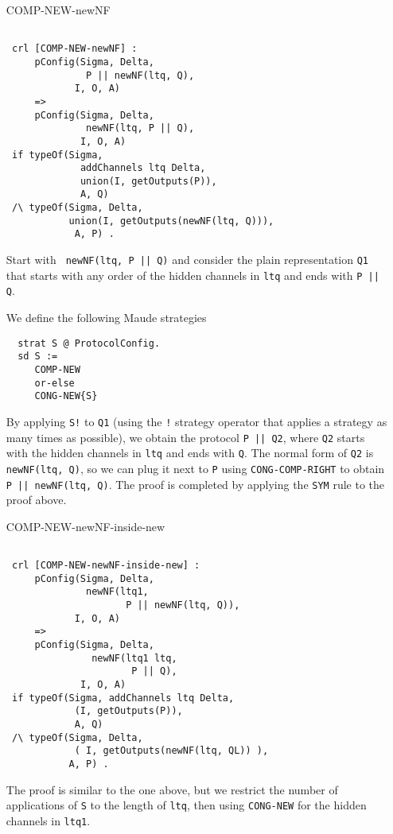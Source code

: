 \documentclass{article}
\begin{document}
\begin{itemize}
\item[COMP-NEW-newNF]
 \begin{lstlisting}  
            
 crl [COMP-NEW-newNF] :
     pConfig(Sigma, Delta, 
              P || newNF(ltq, Q), 
            I, O, A)
     =>   
     pConfig(Sigma, Delta, 
              newNF(ltq, P || Q), 
             I, O, A)
 if typeOf(Sigma, 
             addChannels ltq Delta, 
             union(I, getOutputs(P)), 
             A, Q)
 /\ typeOf(Sigma, Delta, 
           union(I, getOutputs(newNF(ltq, Q))), 
            A, P) .
   \end{lstlisting}
   
  Start with \verb+ newNF(ltq, P || Q)+ and consider
  the plain representation \verb+Q1+ that starts with any order of the
  hidden channels in \verb+ltq+ and ends with \verb+P || Q+.
  
  We define the following Maude strategies
  \begin{lstlisting}
  strat S @ ProtocolConfig.
  sd S := 
     COMP-NEW
     or-else 
     CONG-NEW{S}
  \end{lstlisting}
  By applying \verb+S!+ to \verb+Q1+ (using the \verb+!+ strategy operator
   that applies a strategy as many times as possible), we obtain
   the protocol \verb+P || Q2+, where \verb+Q2+ starts with the hidden channels
   in \verb+ltq+ and ends with \verb+Q+. The normal form of \verb+Q2+ is
   \verb+newNF(ltq, Q)+, so we can plug it next to \verb+P+ using
   \verb+CONG-COMP-RIGHT+ to obtain \verb+P || newNF(ltq, Q)+.
   The proof is completed by applying the \verb+SYM+ rule to the proof above. 
    

\item[COMP-NEW-newNF-inside-new]
 \begin{lstlisting} 
 
 crl [COMP-NEW-newNF-inside-new] : 
     pConfig(Sigma, Delta, 
              newNF(ltq1, 
                     P || newNF(ltq, Q)), 
            I, O, A)
     =>   
     pConfig(Sigma, Delta, 
               newNF(ltq1 ltq, 
                      P || Q), 
             I, O, A)
 if typeOf(Sigma, addChannels ltq Delta, 
            (I, getOutputs(P)), 
            A, Q)
 /\ typeOf(Sigma, Delta, 
            ( I, getOutputs(newNF(ltq, QL)) ), 
           A, P) .
   \end{lstlisting}
   
   The proof is similar to the one above, but we restrict the number 
   of applications of \verb+S+ to the length of \verb+ltq+, then using
   \verb+CONG-NEW+ for the hidden channels in \verb+ltq1+.


\end{itemize}
\end{document}
